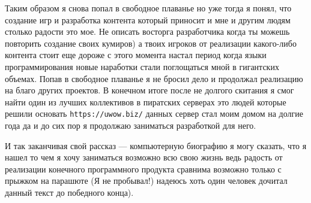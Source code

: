 Таким образом я снова попал в свободное плаванье но уже тогда я понял, что создание игр и разработка контента который приносит и мне и другим людям столько радости это мое. Не описать восторга разработчика когда ты можешь повторить создание своих кумиров) а твоих игроков от реализации какого-либо контента стоит еще дороже с этого момента настал период когда языки программирования новые наработки стали поглощаться мной в гигантских объемах. Попав в свободное плаванье я не бросил дело и продолжал реализацию на благо других проектов. В конечном итоге после не долгого скитания я смог найти один из лучших коллективов в пиратских серверах это людей которые решили основать  \verb|https://uwow.biz/| данных сервер стал моим домом на долгие года да и до сих пор я продолжаю заниматься разработкой для него. 

И так заканчивая свой рассказ --- компьютерную биографию я могу сказать, что я нашел то чем я хочу заниматься возможно всю свою жизнь ведь радость от реализации конечного программного продукта сравнима возможно только с прыжком на парашюте (Я не пробывал!) надеюсь хоть один человек дочитал данный текст до победного конца).